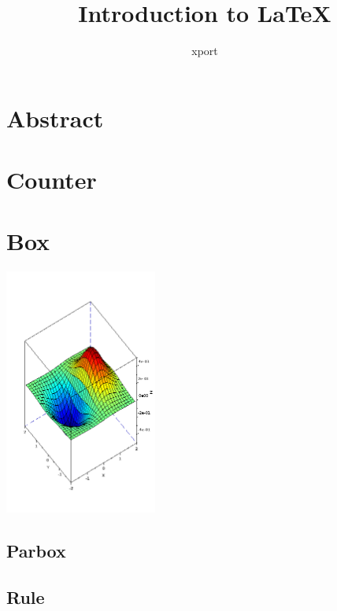 \documentclass{article}
\title{Introduction to \LaTeX}
\author{xport}
\begin{document}
\begin{multicols}{2}
\maketitle
\section*{Abstract}
\lipsum[1-2]
\vfill\null
\columnbreak
\tableofcontents
\section{Counter}
\lipsum[1]
\section{Box}
\lipsum[1]
\includegraphics[width=50mm]{Surf.png}
\subsection{Parbox}
\lipsum[1]
\subsection{Rule}
\lipsum[1]
\end{multicols}
\end{document}
